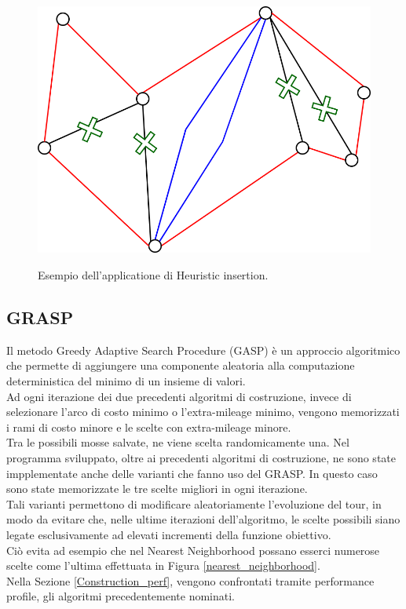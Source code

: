 \begin{figure}[H] 
\begin{center} 
  \includegraphics[scale=0.4]{Images/insertion}\\ 
  \caption{\footnotesize{Esempio dell'applicatione di Heuristic insertion.}}
  \label{insertion}
\end{center}
\end{figure}

\subsection{GRASP}
Il metodo Greedy Adaptive Search Procedure (GASP) è un approccio algoritmico che permette di aggiungere una componente aleatoria alla computazione deterministica del minimo di un insieme di valori.\\
Ad ogni iterazione dei due precedenti algoritmi di costruzione, invece di selezionare l'arco di costo minimo o l'extra-mileage minimo, vengono memorizzati i rami di costo minore e le scelte con extra-mileage minore.\\
Tra le possibili mosse salvate, ne viene scelta randomicamente una. Nel programma sviluppato, oltre ai precedenti algoritmi di costruzione, ne sono state impplementate anche delle varianti che fanno uso del GRASP. In questo caso sono state memorizzate le tre scelte migliori in ogni iterazione.\\
Tali varianti permettono di modificare aleatoriamente l'evoluzione del tour, in modo da evitare che, nelle ultime iterazioni dell'algoritmo, le scelte possibili siano legate esclusivamente ad elevati incrementi della funzione obiettivo.\\
Ciò evita ad esempio che nel Nearest Neighborhood possano esserci numerose scelte come l'ultima effettuata in Figura \ref{nearest_neighborhood}.\\
Nella Sezione \ref{Construction_perf}, vengono confrontati tramite performance profile, gli algoritmi precedentemente nominati.

